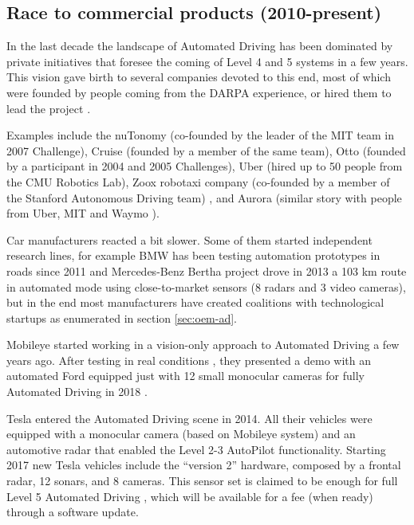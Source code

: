 \documentclass[journal]{IEEEtran}
\begin{document}
\subsection{Race to commercial products (2010-present)}

In the last decade the landscape of Automated Driving has been dominated by 
private initiatives that foresee the coming of Level 4 and 5 systems in a few 
years. This vision gave birth to several companies devoted to this end, most of 
which were founded by people coming from the DARPA experience, or hired them to
lead the project \cite{Chapell2016}. 

Examples include the nuTonomy (co-founded
by the leader of the MIT team in 2007 Challenge), Cruise (founded by a 
member of the same team), Otto (founded by a participant in 2004 and 2005 
Challenges), Uber (hired up to 50 people from the CMU Robotics Lab),  
Zoox robotaxi company (co-founded by a member of the Stanford 
Autonomous Driving team) %
\cite{Levinson2011a}, and Aurora (similar story with people from 
Uber, MIT and Waymo \cite{Anderson2013}).

Car manufacturers reacted a bit slower. 
Some of them started independent research lines, for example
BMW has been testing automation prototypes in roads since 2011 
\cite{Aeberhard2015a} and Mercedes-Benz Bertha project \cite{Ziegler2014}
drove in 2013 a 103 km route in automated mode using close-to-market sensors
(8 radars and 3 video cameras), but in the end most manufacturers have created 
coalitions with technological startups as enumerated in section \ref{sec:oem-ad}.

Mobileye started working in a vision-only approach to Automated Driving a few years ago. 
After testing in real conditions \cite{Edelstein2018}, they presented a demo 
with an automated Ford equipped just with 12 small monocular cameras for fully 
Automated Driving in 2018 \cite{Scheer2018}.

Tesla entered the Automated Driving scene in 2014.
All their vehicles were equipped with a monocular camera (based on 
Mobileye system) and an automotive radar that enabled the Level 2-3 AutoPilot
functionality. 
Starting 2017 new Tesla vehicles include the ``version 2'' hardware, 
composed by a frontal radar, 12 sonars, and 8 cameras.
This sensor set is claimed to be enough for full Level 5 Automated Driving
\cite{Hawkins2017}, which will be available for a fee (when ready) through a
software update.
\end{document}
